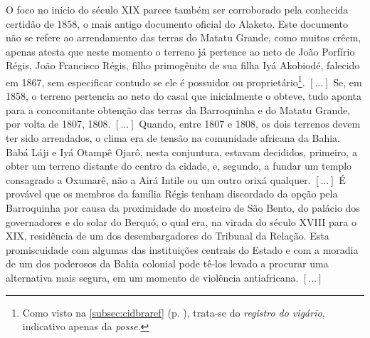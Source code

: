 \begin{citacao}
O foco no início do século XIX parece também ser corroborado pela conhecida certidão de 1858, o mais antigo documento oficial do Alaketo. Este documento não se refere ao arrendamento das terras do Matatu Grande, como muitos crêem, apenas atesta que neste momento o terreno já pertence ao neto de João Porfírio Régis, João Francisco Régis, filho primogênito de sua filha Iyá Akobiodé, falecido em 1867, sem especificar contudo se ele é possuidor ou proprietário\footnote{Como visto na \autoref{subsec:cidbraref} (p. \pageref{subsec:cidbraref}), trata-se do \textit{registro do vigário}, indicativo apenas da \textit{posse}.}. \([\dots]\) Se, em 1858, o terreno pertencia ao neto do casal que inicialmente o obteve, tudo aponta para a concomitante obtenção das terras da Barroquinha e do Matatu Grande, por volta de 1807, 1808. \([\dots]\) Quando, entre 1807 e 1808, os dois terrenos devem ter sido arrendados, o clima era de tensão na comunidade africana da Bahia. Babá Láji e Iyá Otampê Ojarô, nesta conjuntura, estavam decididos, primeiro, a obter um terreno distante do centro da cidade, e, segundo, a fundar um templo consagrado a Oxumarê, não a Airá Intile ou um outro orixá qualquer. \([\dots]\) É provável que os membros da família Régis tenham discordado da opção pela Barroquinha por causa da proximidade do mosteiro de São Bento, do palácio dos governadores e do solar do Berquó, o qual era, na virada do século XVIII para o XIX, residência de um dos desembargadores do Tribunal da Relação. Esta promiscuidade com algumas das instituições centrais do Estado e com a moradia de um dos poderosos da Bahia colonial pode tê-los levado a procurar uma alternativa mais segura, em um momento de violência antiafricana. \([\dots]\)


\end{citacao}
